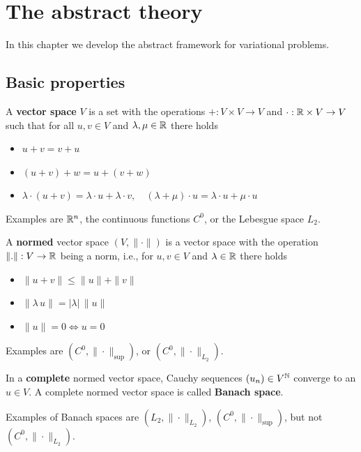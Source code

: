 \chapter{The abstract theory}

In this chapter we develop the abstract framework for variational problems.

\section{Basic properties}

\begin{definition}A {\bf vector space} $V$ is a set with
the operations $+ : V \times V \rightarrow V$ and $\cdot : {\mathbb R} \times V
\rightarrow V$ such that for all $u,v \in V$ and $\lambda, \mu \in {\mathbb R}$
there holds
\begin{itemize}
\item $u + v = v + u$
\item $(u+v)+w = u + (v+w)$
\item $\lambda \cdot (u+v) = 
\lambda \cdot u + \lambda \cdot v, \quad 
(\lambda + \mu) \cdot u = \lambda \cdot u + \mu \cdot u$
\end{itemize}
\end{definition}
\noindent
Examples are ${\mathbb R}^n$, the continuous functions $C^0$, or the Lebesgue space $L_2$.

\begin{definition} A {\bf normed} vector space $(V,\|\cdot\|)$ is a vector 
space with the operation $\| . \| : V \rightarrow {\mathbb R}$ being a norm, i.e.,
for $u,v \in V$ and $\lambda \in {\mathbb R}$ there holds
\begin{itemize}
\item
$\| u + v \| \leq \| u \| + \| v \|$
\item
$\| \lambda \, u \| = | \lambda | \, \| u \|$
\item
$\| u \| = 0 \Leftrightarrow u = 0$
\end{itemize}
\end{definition}
\noindent
Examples are $(C^0, \|\cdot\|_{\sup})$, or $(C^0, \|\cdot\|_{L_2})$.

\begin{definition} In a {\bf complete} normed vector space, Cauchy sequences 
$(u_n) \in V^{\mathbb N}$ converge to an $u \in V$. A complete normed vector space
is called {\bf Banach space}.
\end{definition}
\noindent
Examples of Banach spaces are $(L_2, \|\cdot\|_{L_2})$, 
$(C^0, \|\cdot\|_{\sup})$, but not $(C^0, \|\cdot\|_{L_2})$.

